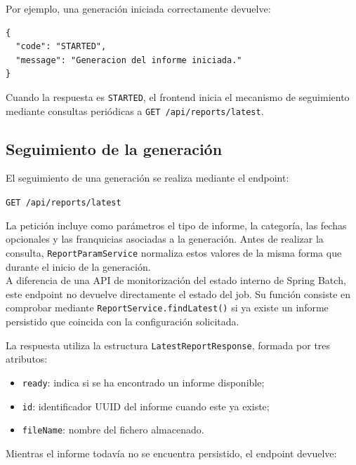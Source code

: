 \documentclass[11pt,a4paper,titlepage,oneside]{report}
\begin{document}
Por ejemplo, una generación iniciada correctamente devuelve:

\begin{lstlisting}[caption={Ejemplo de respuesta al iniciar una generación}]
{
  "code": "STARTED",
  "message": "Generacion del informe iniciada."
}
\end{lstlisting}

Cuando la respuesta es \texttt{STARTED}, el frontend inicia el mecanismo de
seguimiento mediante consultas periódicas a
\texttt{GET /api/reports/latest}.

\subsection{Seguimiento de la generación}

El seguimiento de una generación se realiza mediante el endpoint:

\begin{center}
\texttt{GET /api/reports/latest}
\end{center}

La petición incluye como parámetros el tipo de informe, la categoría, las
fechas opcionales y las franquicias asociadas a la generación. Antes de
realizar la consulta, \texttt{ReportParamService} normaliza estos valores de
la misma forma que durante el inicio de la generación. \\

A diferencia de una API de monitorización del estado interno de Spring Batch,
este endpoint no devuelve directamente el estado del job. Su función consiste
en comprobar mediante \texttt{ReportService.findLatest()} si ya existe un
informe persistido que coincida con la configuración solicitada.

La respuesta utiliza la estructura \texttt{LatestReportResponse}, formada por
tres atributos:

\begin{itemize}

  \item \texttt{ready}: indica si se ha encontrado un informe disponible;

  \item \texttt{id}: identificador UUID del informe cuando este ya existe;

  \item \texttt{fileName}: nombre del fichero almacenado.

\end{itemize}

Mientras el informe todavía no se encuentra persistido, el endpoint devuelve:
\end{document}

